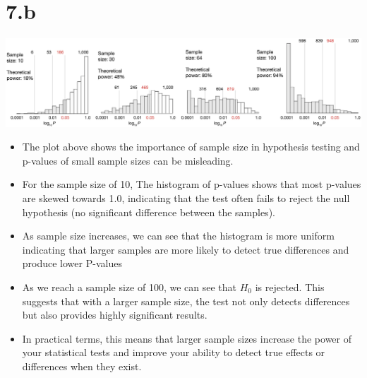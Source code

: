 \documentclass[12pt]{article}
\begin{document}
\section*{7.b}
\includegraphics*[width=\linewidth]{graph7b}
\begin{itemize}
    \item The plot above shows the importance of sample size in hypothesis testing
    and p-values of small sample sizes can be misleading.
    \item For the sample size of 10, The histogram of p-values shows that most
    p-values are skewed towards 1.0, indicating that the test often fails to
    reject the null hypothesis (no significant difference between the samples).
    \item As sample size increases, we can see that the histogram is more uniform
    indicating that larger samples are more likely to detect true differences and
    produce lower P-values
    \item As we reach a sample size of 100, we can see that \(H_0\) is rejected.
    This suggests that with a larger sample size, the test not only detects differences
    but also provides highly significant results.
    \item  In practical terms, this means that larger sample sizes increase the
    power of your statistical tests and improve your ability to detect true
    effects or differences when they exist.
\end{itemize}

\newpage
\end{document}
